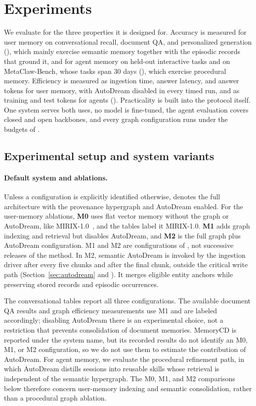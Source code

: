 \section{Experiments}
\label{sec:experiments}

We evaluate \ours for the three properties it is designed for. Accuracy is
measured for user memory on conversational recall, document QA, and
personalized generation (), which mainly exercise semantic
memory together with the episodic records that ground it, and for agent memory
on held-out interactive tasks and on
MetaClaw-Bench, whose tasks span 30 days (), which exercise procedural memory. Efficiency is measured
as ingestion time, answer latency, and answer tokens for user memory, with
AutoDream disabled in every timed run, and as training and test tokens for
agents (). Practicality is built into the protocol itself. One system serves both uses, no model is fine-tuned, the agent
evaluation covers closed and open backbones, and every graph configuration runs
under the budgets of .

\subsection{Experimental setup and system variants}
\label{sec:exp-setup}

\paragraph{Default system and ablations.}
Unless a configuration is explicitly identified otherwise, \ours denotes the
full architecture with the provenance hypergraph and AutoDream enabled.
For the user-memory ablations, \textbf{M0} uses flat vector memory without the
graph or AutoDream, like MIRIX-1.0~\citep{mirix}, and the tables label it
MIRIX-1.0. \textbf{M1} adds graph indexing and retrieval but disables
AutoDream, and \textbf{M2} is the full graph plus AutoDream configuration.
M1 and M2 are configurations of \ours, not successive releases of the
method. In M2, semantic AutoDream is invoked by the ingestion driver after
every five chunks and after the final chunk, outside the critical write path (Section~\ref{sec:autodream} and ). It merges eligible entity anchors while preserving
stored records and episodic occurrences.

The conversational tables report all three configurations. The available
document QA results and graph efficiency measurements use M1 and are labeled
accordingly; disabling AutoDream there is an experimental choice, not a
restriction that prevents consolidation of document memories. MemoryCD is
reported under the system name, but its recorded results do not identify an
M0, M1, or M2 configuration, so we do not use them to estimate the contribution
of AutoDream. For agent memory, we evaluate the procedural refinement path,
in which AutoDream distills sessions into reusable skills whose retrieval is
independent of the semantic hypergraph. The M0, M1, and M2 comparisons below
therefore concern user-memory indexing and semantic consolidation, rather
than a procedural graph ablation.

